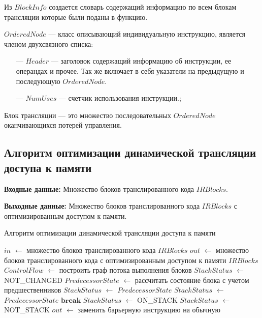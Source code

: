 Из $BlockInfo$ создается словарь содержащий информацию по всем блокам трансляции которые были поданы в функцию.

$OrderedNode$ --- класс описывающий индивидуальную инструкцию, является членом двухсвязного списка:

\begin{itemize}[leftmargin=1.6\parindent]
	\item[---] $Header$ --- заголовок содержащий информацию об инструкции, ее операндах и прочее. Так же включает в себя указатели на предыдущую и последующую $OrderedNode$.
	\item[---] $NumUses$ --- счетчик использования инструкции.;
\end{itemize}

Блок трансляции --- это множество последовательных $OrderedNode$ оканчивающихся потерей управления.



\subsection{Алгоритм оптимизации динамической трансляции доступа к памяти}

\textbf{Входные данные:} Множество блоков транслированного кода $IRBlocks$.

\textbf{Выходные данные:} Множество блоков транслированного кода $IRBlocks$ с оптимизированным доступом к памяти.

\begin{algorithm}[H]
\small
	\caption{Алгоритм оптимизации динамической трансляции доступа к памяти}
	\label{alg:memopt}
	\begin{algorithmic}[1]
		\State $in$ $\gets$ множество блоков транслированного кода $IRBlocks$
		\State $out$ $\gets$ множество блоков транслированного кода с оптимизированным доступом к памяти $IRBlocks$
		\State $ControlFlow$ $\gets$ построить граф потока выполнения блоков
		\State $StackStatus$ $\gets$ NOT\_CHANGED 
		\State $PredecessorState$ $\gets$ рассчитать состояние блока с учетом предшественников
		\State $StackStatus$ $\gets$ $PredecessorState$
		\EndIf
		\State $StackStatus$ $\gets$ $PredecessorState$
		\State $\mathbf{break}$
		\EndIf
		\EndFor
		\State $StackStatus$ $\gets$ ON\_STACK
		\EndIf
		\State $StackStatus$ $\gets$ NOT\_STACK
		\EndIf
		\State $out$ $\gets$ заменить барьерную инструкцию на обычную
		\EndIf
		\EndFor
		\EndFor
	\end{algorithmic}
\end{algorithm}

